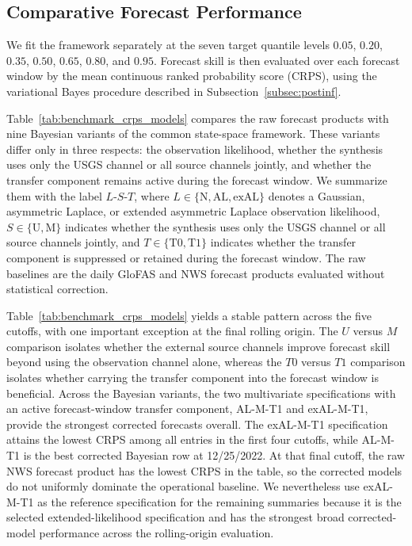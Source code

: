\documentclass[APA,STIX1COL]{WileyNJD-v2}
\begin{document}
\subsection{Comparative Forecast Performance}
\label{subsec:benchmarkresults}

We fit the framework separately at the seven target quantile levels \(0.05\), \(0.20\), \(0.35\), \(0.50\), \(0.65\), \(0.80\), and \(0.95\). Forecast skill is then evaluated over each forecast window by the mean continuous ranked probability score (CRPS), using the variational Bayes procedure described in Subsection~\ref{subsec:postinf}.

Table~\ref{tab:benchmark_crps_models} compares the raw forecast products with nine Bayesian variants of the common state-space framework. These variants differ only in three respects: the observation likelihood, whether the synthesis uses only the USGS channel or all source channels jointly, and whether the transfer component remains active during the forecast window. We summarize them with the label \(L\)-\(S\)-\(T\), where \(L\in\{\mathrm{N},\mathrm{AL},\mathrm{exAL}\}\) denotes a Gaussian, asymmetric Laplace, or extended asymmetric Laplace observation likelihood, \(S\in\{\mathrm{U},\mathrm{M}\}\) indicates whether the synthesis uses only the USGS channel or all source channels jointly, and \(T\in\{\mathrm{T0},\mathrm{T1}\}\) indicates whether the transfer component is suppressed or retained during the forecast window. The raw baselines are the daily GloFAS and NWS forecast products evaluated without statistical correction.



Table~\ref{tab:benchmark_crps_models} yields a stable pattern across the five cutoffs, with one important exception at the final rolling origin. The \(U\) versus \(M\) comparison isolates whether the external source channels improve forecast skill beyond using the observation channel alone, whereas the \(T0\) versus \(T1\) comparison isolates whether carrying the transfer component into the forecast window is beneficial. Across the Bayesian variants, the two multivariate specifications with an active forecast-window transfer component, AL-M-T1 and exAL-M-T1, provide the strongest corrected forecasts overall. The exAL-M-T1 specification attains the lowest CRPS among all entries in the first four cutoffs, while AL-M-T1 is the best corrected Bayesian row at 12/25/2022. At that final cutoff, the raw NWS forecast product has the lowest CRPS in the table, so the corrected models do not uniformly dominate the operational baseline. We nevertheless use exAL-M-T1 as the reference specification for the remaining summaries because it is the selected extended-likelihood specification and has the strongest broad corrected-model performance across the rolling-origin evaluation.
\end{document}
